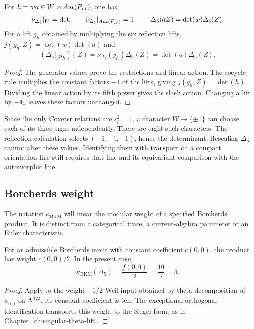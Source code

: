 \begin{lemma}
\label{lem:bkm-maass-restriction}
For $h=wa\in W\rtimes Aut(P_{II})$, one has
\[
 \widetilde\nu_{\Delta_5}|_W=\det,\qquad
 \widetilde\nu_{\Delta_5}|_{Aut(P_{II})}=1,
 \qquad \Delta_5(hZ)=\det(w)\Delta_5(Z).
\]
For a lift $g_h$ obtained by multiplying the six reflection lifts,
$j(g_h,Z)=\det(w)\det(a)$ and
\[
 (\Delta_5|_5g_h)(Z)=\nu_{\Delta_5}(g_h)\Delta_5(Z)
                     =\det(a)\Delta_5(Z).
\]
\end{lemma}
\begin{proof}
The generator values prove the restrictions and linear action.
The cocycle rule multiplies the constant factors $-1$ of the lifts,
giving $j(g_h,Z)=\det(h)$. Dividing the linear action by its fifth
power gives the slash action. Changing a lift by $-\mathbf{I}_4$ leaves
these factors unchanged.
\end{proof}

\begin{remark}
\label{rem:bkm-why-determinant}
Since the only Coxeter relations are $s_i^2=1$, a character
$W\to\{\pm1\}$ can choose each of its three signs independently.
There are eight such characters. The reflection calculation selects
$(-1,-1,-1)$, hence the determinant. Rescaling $\Delta_5$ cannot
alter these values. Identifying them with transport on a compact
orientation line still requires that line and its equivariant
comparison with the automorphic line.
\end{remark}

\subsection{Borcherds weight}
\label{sec:bkm-kappa-borcherds-weight}
\label{sec:bkm-volIII-frame}

The notation $\kappa_{\mathrm{BKM}}$ will mean the modular weight
of a specified Borcherds product. It is distinct from a categorical
trace, a current-algebra parameter or an Euler characteristic.

\begin{theorem}
\label{thm:bkm-kappa-universal}
For an admissible Borcherds input with constant coefficient
$c(0,0)$, the product has weight $c(0,0)/2$. In the present case,
\begin{equation}
\label{eq:bkm-kappa-formula}
 \kappa_{\mathrm{BKM}}(\Delta_5)=\frac{f(0,0)}2=\frac{10}2=5.
\end{equation}
\end{theorem}
\begin{proof}
Apply \cite[Theorem~13.3]{B} to the weight-$-1/2$ Weil input
obtained by theta decomposition of $\phi_{0,1}$ on $\Lambda^{3,2}$.
Its constant coefficient is ten. The exceptional orthogonal
identification transports this weight to the Siegel form, as in
Chapter~\ref{ch:singular-theta-lift}.
\end{proof}


